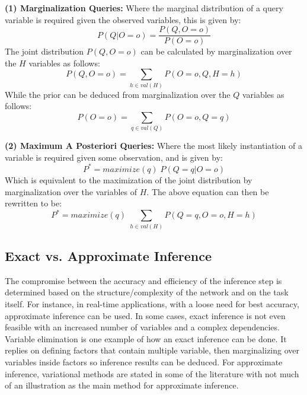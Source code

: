\documentclass{article}
\begin{document}
\noindent
\textbf{(1) Marginalization Queries:} Where the marginal distribution of a query variable is required given the observed variables, this is given by:
\begin{equation}
P(Q|O=o) = \frac{P(Q,O=o)}{P(O=o)}
\end{equation}
The joint distribution $P(Q, O=o)$ can be calculated by marginalization over the $H$ variables as follows:
\begin{equation}
P(Q,O=o) = \sum_{h \in val(H)} P(O=o, Q, H=h)
\end{equation}
While the prior can be deduced from marginalization over the $Q$ variables as follows:
\begin{equation}
P(O=o) = \sum_{q \in val(Q)} P(O=o, Q=q)
\end{equation}

\noindent
\textbf{(2) Maximum A Posteriori Queries:} Where the most likely instantiation of a variable is required given some observation, and is given by:
\begin{equation}
P^{*} = maximize(q) \; P(Q=q |O=o)
\end{equation}
Which is equivalent to the maximization of the joint distribution by marginalization over the variables of $H$. The above equation can then be rewritten to be:
\begin{equation}
P^{*} =  maximize(q) \; \sum_{h \in val(H)} P(Q=q, O=o, H=h)
\end{equation}

\subsection{Exact vs. Approximate Inference}
The compromise between the accuracy and efficiency of the inference step is determined based on the structure/complexity of the network and on the task itself. For instance, in real-time applications, with a loose need for best accuracy, approximate inference can be used. In some cases, exact inference is not even feasible with an increased number of variables and a complex dependencies. Variable elimination is one example of how an exact inference can be done. It replies on defining factors that contain multiple variable, then marginalizing over variables inside factors so inference results can be deduced. For approximate inference, variational methods are stated in some of the literature with not much of an illustration as the main method for approximate inference.
\end{document}
